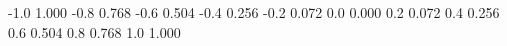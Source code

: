   -1.0 1.000
  -0.8 0.768
  -0.6 0.504
  -0.4 0.256
  -0.2 0.072
   0.0 0.000
   0.2 0.072
   0.4 0.256
   0.6 0.504
   0.8 0.768
   1.0 1.000
